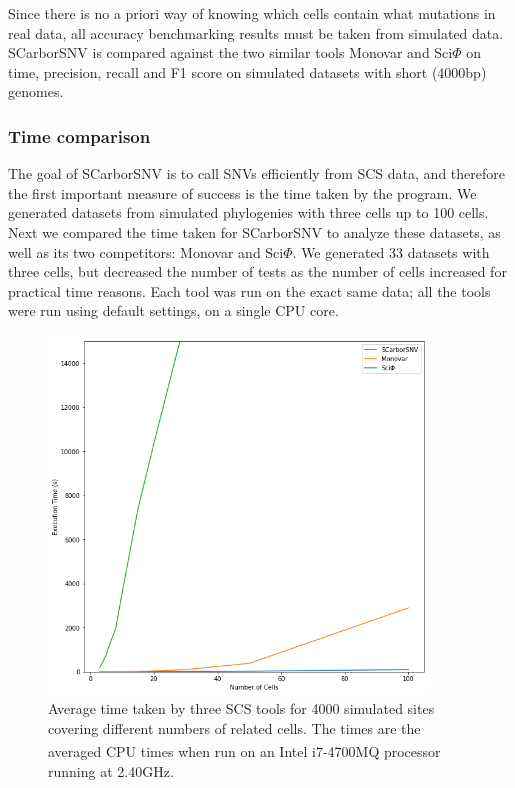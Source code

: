 \documentclass[../../main.tex]{subfiles}
\begin{document}
Since there is no a priori way of knowing which cells contain what mutations in real data, all accuracy benchmarking results must be taken from simulated data.
SCarborSNV is compared against the two similar tools Monovar and Sci$\Phi$ on time, precision, recall and F1 score on simulated datasets with short (4000bp) genomes.

\subsubsection*{Time comparison}
The goal of SCarborSNV is to call SNVs efficiently from SCS data, and therefore the first important measure of success is the time taken by the program.
We generated datasets from simulated phylogenies with three cells up to 100 cells.
Next we compared the time taken for SCarborSNV to analyze these datasets, as well as its two competitors: Monovar and Sci$\Phi$.
We generated 33 datasets with three cells, but decreased the number of tests as the number of cells increased for practical time reasons.
Each tool was run on the exact same data; all the tools were run using default settings, on a single CPU core.
\begin{figure}[h] 
    \includegraphics[width=0.9\textwidth]{sections/graphics/time}
    \caption{Average time taken by three SCS tools for 4000 simulated sites covering different numbers of related cells.
    The times are the averaged CPU times when run on an Intel\textsuperscript{\textregistered} i7-4700MQ processor running at 2.40GHz.}
    \label{fig:runningtime}
\end{figure}
\end{document}
